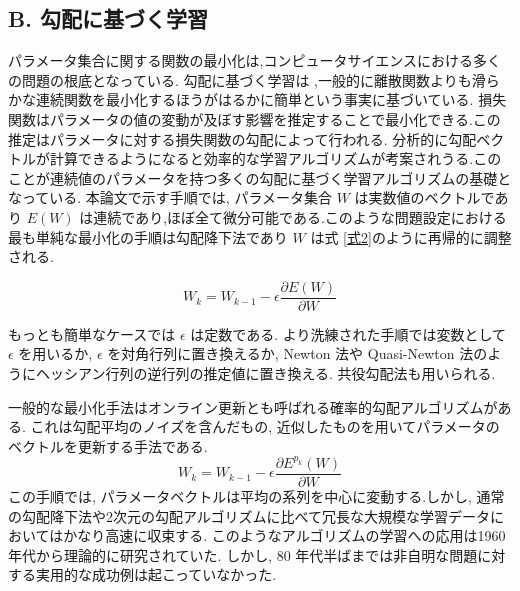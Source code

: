 \documentclass[twocolumn]{jarticle}     %
\begin{document}
\subsection*{B. 勾配に基づく学習}
パラメータ集合に関する関数の最小化は,コンピュータサイエンスにおける多くの問題の根底となっている. 勾配に基づく学習は
,一般的に離散関数よりも滑らかな連続関数を最小化するほうがはるかに簡単という事実に基づいている.
損失関数はパラメータの値の変動が及ぼす影響を推定することで最小化できる.この推定はパラメータに対する損失関数の勾配によって行われる. 分析的に勾配ベクトルが計算できるようになると効率的な学習アルゴリズムが考案されうる.このことが連続値のパラメータを持つ多くの勾配に基づく学習アルゴリズムの基礎となっている.
本論文で示す手順では,
パラメータ集合 $W$ は実数値のベクトルであり $E(W)$ は連続であり,ほぼ全て微分可能である.このような問題設定における最も単純な最小化の手順は勾配降下法であり $W$ は式 \ref{式2}のように再帰的に調整される.

\begin{equation}
  \label{式2}
  W_{k} = W_{k-1} - \epsilon \frac{\partial E(W)}{\partial W}
\end{equation}

もっとも簡単なケースでは $\epsilon$ は定数である. より洗練された手順では変数として $\epsilon$ を用いるか, $\epsilon$ を対角行列に置き換えるか, Newton 法や Quasi-Newton 法のようにヘッシアン行列の逆行列の推定値に置き換える. 共役勾配法も用いられる.
\par
一般的な最小化手法はオンライン更新とも呼ばれる確率的勾配アルゴリズムがある.
これは勾配平均のノイズを含んだもの, 近似したものを用いてパラメータのベクトルを更新する手法である. 
\begin{equation}
  \label{式3}
  W_{k} = W_{k-1} - \epsilon \frac{\partial E^{p_k}(W)}{\partial W}
\end{equation}
この手順では, パラメータベクトルは平均の系列を中心に変動する.しかし, 通常の勾配降下法や2次元の勾配アルゴリズムに比べて冗長な大規模な学習データにおいてはかなり高速に収束する. 
このようなアルゴリズムの学習への応用は1960年代から理論的に研究されていた. しかし, 80 年代半ばまでは非自明な問題に対する実用的な成功例は起こっていなかった.
\end{document}
